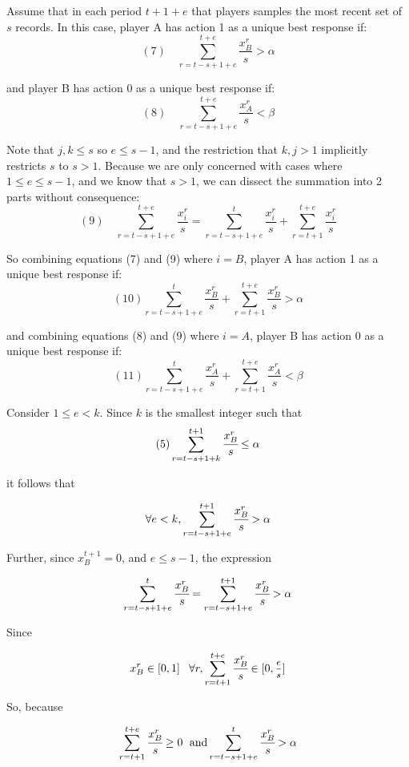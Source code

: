 \documentclass{article}
\begin{document}
\vskip6pt

Assume that in each period $t+1+e$ that players samples the most recent set of $s$ records. In this case, player A has action 1 as a unique best response if: 
$$(7) \hspace{12pt} \sum\limits_{r=t-s+1+e}^{t+e} \frac{x^r_B}{s} > \alpha$$

and player B has action 0 as a unique best response if:
$$(8) \hspace{12pt} \sum\limits_{r=t-s+1+e}^{t+e} \frac{x^r_A}{s} < \beta$$

Note that $j, k \leq s$ so $e \leq s-1$, and the restriction that $k,j > 1$ implicitly restricts $s$ to $s>1$. Because we are only concerned with cases where $1 \leq e \leq s-1$, and we know that $s>1$, we can dissect the summation into 2 parts without consequence:
$$(9) \hspace{12pt} \sum\limits_{r=t-s+1+e}^{t+e} \frac{x^r_i}{s} = \sum\limits_{r=t-s+1+e}^{t}\frac{x^r_i}{s}+\sum\limits_{r=t+1}^{t+e} \frac{x^r_i}{s}$$

So combining equations (7) and (9) where $i=B$, player A has action 1 as a unique best response if: 
$$(10) \sum\limits_{r=t-s+1+e}^{t}\frac{x^r_B}{s}+\sum\limits_{r=t+1}^{t+e} \frac{x^r_B}{s} > \alpha$$

and combining equations (8) and (9) where $i=A$, player B has action 0 as a unique best response if:
$$(11) \sum\limits_{r=t-s+1+e}^{t}\frac{x^r_A}{s}+\sum\limits_{r=t+1}^{t+e} \frac{x^r_A}{s} < \beta$$

\vskip18pt

Consider $1 \leq e<k$. Since $k$ is the smallest integer such that $$(5) \sum\limits_{r=t-s+1+k}^{t+1} \cfrac{x^r_B}{s} \leq \alpha$$

it follows that 

$$\forall e<k, \sum\limits_{r=t-s+1+e}^{t+1} \cfrac{x^r_B}{s} > \alpha$$ 

Further, since $x^{t+1}_B = 0$, and $e \leq s-1$, the expression 

$$\sum\limits_{r=t-s+1+e}^{t} \cfrac{x^r_B}{s} = \sum\limits_{r=t-s+1+e}^{t+1} \cfrac{x^r_B}{s} > \alpha$$

Since 

$$x_B^r \in [0,1] \hspace{8pt} \forall r, \sum\limits_{r=t+1}^{t+e} \cfrac{x^r_B}{s} \in [0,\mfrac{e}{s}]$$

So, because 

$$\sum\limits_{r=t+1}^{t+e} \cfrac{x^r_B}{s} \geq 0 \hspace{6pt}\text{and} \sum\limits_{r=t-s+1+e}^{t} \cfrac{x^r_B}{s} > \alpha$$
\end{document}
